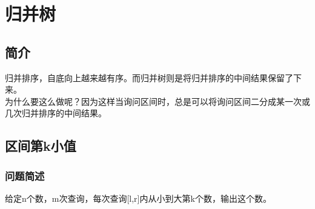 \section{归并树}
\subsection{简介}
    归并排序，自底向上越来越有序。而归并树则是将归并排序的中间结果保留了下来。\\
    为什么要这么做呢？因为这样当询问区间时，总是可以将询问区间二分成某一次或几次归并排序的中间结果。
\subsection{区间第k小值}
    \subsubsection{问题简述}
        给定n个数，m次查询，每次查询[l,r]内从小到大第k个数，输出这个数。
